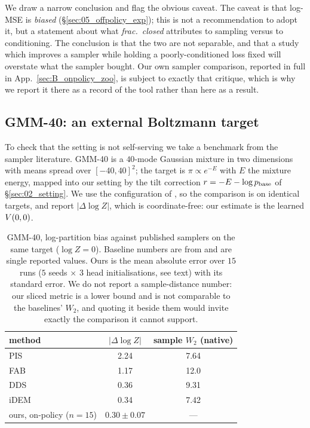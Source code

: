 We draw a narrow conclusion and flag the obvious caveat. The caveat is that
log-MSE is \emph{biased} (\S\ref{sec:05_offpolicy_exp}); this is not a
recommendation to adopt it, but a statement about what \emph{frac.\ closed}
attributes to sampling versus to conditioning. The conclusion is that the two
are not separable, and that a study which improves a sampler while holding a
poorly-conditioned loss fixed will overstate what the sampler bought. Our own
sampler comparison, reported in full in App.~\ref{sec:B_onpolicy_zoo}, is
subject to exactly that critique, which is why we report it there as a record
of the tool rather than here as a result.

\subsection{GMM-40: an external Boltzmann target}
\label{subsec:gmm40}

To check that the setting is not self-serving we take a benchmark from the
sampler literature. GMM-40 is a $40$-mode Gaussian mixture in two dimensions
with means spread over $[-40,40]^2$; the target is $\pi\propto e^{-E}$ with $E$
the mixture energy, mapped into our setting by the tilt correction
$r=-E-\log p_{\mathrm{base}}$ of \S\ref{sec:02_setting}. We use the configuration of
\citet{akhoundsadegh2024idem}, so the comparison is on identical targets, and
report $|\Delta\log Z|$, which is coordinate-free: our estimate is the learned
$V(0,0)$.

\begin{table}[t]
\centering\small
\caption{GMM-40, log-partition bias against published samplers on the same
target ($\log Z=0$). Baseline numbers are from \citet{akhoundsadegh2024idem}
and are single reported values. Ours is the mean absolute error over $15$ runs
($5$ seeds $\times$ $3$ head initialisations, see text) with its standard
error. We do not report a sample-distance number: our sliced metric is a lower
bound and is not comparable to the baselines' $W_2$, and quoting it beside them
would invite exactly the comparison it cannot support.}
\label{tab:gmm40}
\begin{tabular}{lcc}
\toprule
method & $|\Delta \log Z|$ & sample $W_2$ (native) \\
\midrule
PIS \citep{zhang2021pis}   & 2.24 & 7.64 \\
FAB \citep{midgley2021fab} & 1.17 & 12.0 \\
DDS \citep{vargas2023dds}  & 0.36 & 9.31 \\
iDEM \citep{akhoundsadegh2024idem} & 0.34 & 7.42 \\
\midrule
ours, on-policy ($n=15$)   & $0.30\pm0.07$ & --- \\
\bottomrule
\end{tabular}
\end{table}

